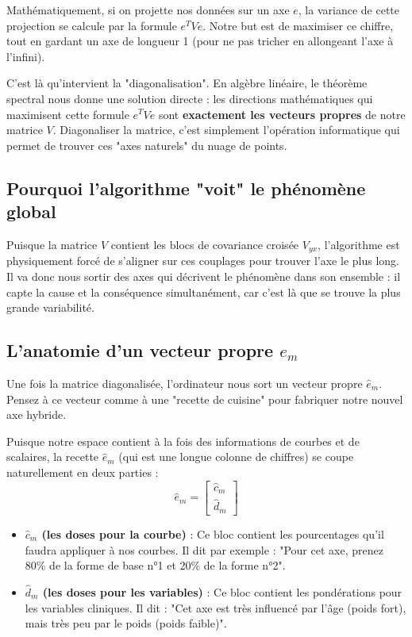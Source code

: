 \documentclass[11pt, a4paper]{article}
\begin{document}
Mathématiquement, si on projette nos données sur un axe $e$, la variance de cette projection se calcule par la formule $e^T V e$. Notre but est de maximiser ce chiffre, tout en gardant un axe de longueur 1 (pour ne pas tricher en allongeant l'axe à l'infini).



C'est là qu'intervient la "diagonalisation". En algèbre linéaire, le théorème spectral nous donne une solution directe : les directions mathématiques qui maximisent cette formule $e^T V e$ sont \textbf{exactement les vecteurs propres} de notre matrice $V$.
Diagonaliser la matrice, c'est simplement l'opération informatique qui permet de trouver ces "axes naturels" du nuage de points.

\subsection{Pourquoi l'algorithme "voit" le phénomène global}
Puisque la matrice $V$ contient les blocs de covariance croisée $V_{yx}$, l'algorithme est physiquement forcé de s'aligner sur ces couplages pour trouver l'axe le plus long. Il va donc nous sortir des axes qui décrivent le phénomène dans son ensemble : il capte la cause et la conséquence simultanément, car c'est là que se trouve la plus grande variabilité.

\subsection{L'anatomie d'un vecteur propre $e_m$}
Une fois la matrice diagonalisée, l'ordinateur nous sort un vecteur propre $\hat{e}_m$. Pensez à ce vecteur comme à une "recette de cuisine" pour fabriquer notre nouvel axe hybride.

Puisque notre espace contient à la fois des informations de courbes et de scalaires, la recette $\hat{e}_m$ (qui est une longue colonne de chiffres) se coupe naturellement en deux parties :
\begin{equation}
\hat{e}_m = \begin{bmatrix} \hat{c}_m \\ \hat{d}_m \end{bmatrix}
\end{equation}
\begin{itemize}
    \item \textbf{$\hat{c}_m$ (les doses pour la courbe)} : Ce bloc contient les pourcentages qu'il faudra appliquer à nos courbes. Il dit par exemple : "Pour cet axe, prenez 80\% de la forme de base n°1 et 20\% de la forme n°2".
    \item \textbf{$\hat{d}_m$ (les doses pour les variables)} : Ce bloc contient les pondérations pour les variables cliniques. Il dit : "Cet axe est très influencé par l'âge (poids fort), mais très peu par le poids (poids faible)".
\end{itemize}
\end{document}
